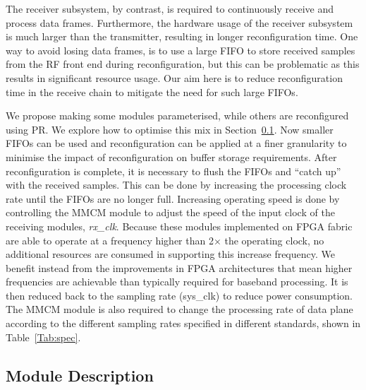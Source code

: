 The receiver subsystem, by contrast, is required to continuously receive and process data frames.
Furthermore, the hardware usage of the receiver subsystem is much larger than the transmitter, resulting in longer reconfiguration time.
One way to avoid losing data frames, is to use a large FIFO to store received samples from the RF front end during reconfiguration, but this can be problematic as this results in significant resource usage.
Our aim here is to reduce reconfiguration time in the receive chain to mitigate the need for such large FIFOs.

We propose making some modules parameterised, while others are reconfigured using PR.
We explore how to optimise this mix in Section~\ref{sec:7module}.
Now smaller FIFOs can be used and reconfiguration can be applied at a finer granularity to minimise the impact of reconfiguration on buffer storage requirements.
After reconfiguration is complete, it is necessary to flush the FIFOs and ``catch up'' with the received samples.
This can be done by increasing the processing clock rate until the FIFOs are no longer full.
Increasing operating speed is done by controlling the MMCM module to adjust the speed of the input clock of the receiving modules, \emph{rx\_clk}. Because these modules implemented on FPGA fabric are able to operate at a frequency higher than 2$\times$ the operating clock, no additional resources are consumed in supporting this increase frequency.
We benefit instead from the improvements in FPGA architectures that mean higher frequencies are achievable than typically required for baseband processing.
It is then reduced back to the sampling rate (sys\_clk) to reduce power consumption.
The MMCM module is also required to change the processing rate of data plane according to the different sampling rates specified in different standards, shown in Table~\ref{Tab:spec}.

\subsection{Module Description}\label{sec:7module}

